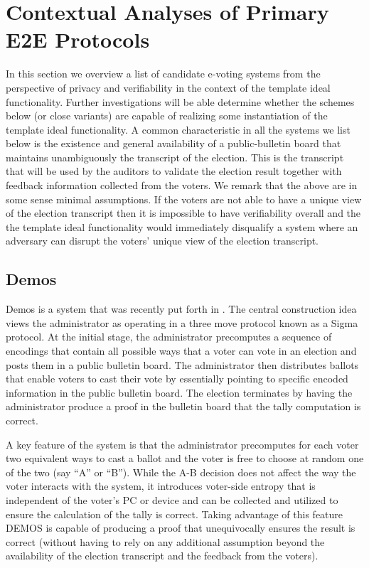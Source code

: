 \section{Contextual Analyses of Primary E2E Protocols}

In this section we overview a list of candidate e-voting systems from
the perspective of privacy and verifiability in the context of the
template ideal functionality. Further investigations will be able
determine whether the schemes below (or close variants) are capable of
realizing some instantiation of the template ideal functionality.  A
common characteristic in all the systems we list below is the
existence and general availability of a public-bulletin board that
maintains unambiguously the transcript of the election. This is the
transcript that will be used by the auditors to validate the election
result together with feedback information collected from the voters.
We remark that the above are in some sense minimal assumptions. If the
voters are not able to have a unique view of the election transcript
then it is impossible to have verifiability overall and the the
template ideal functionality would immediately disqualify a system
where an adversary can disrupt the voters' unique view of the election
transcript.

\subsection{Demos}

Demos is a system that was recently put forth in \cite{demos}. The
central construction idea views the administrator as operating in a
three move protocol known as a Sigma protocol. At the initial stage,
the administrator precomputes a sequence of encodings that contain all
possible ways that a voter can vote in an election and posts them in a
public bulletin board.  The administrator then distributes ballots
that enable voters to cast their vote by essentially pointing to
specific encoded information in the public bulletin board. The
election terminates by having the administrator produce a proof in the
bulletin board that the tally computation is correct.

A key feature of the system is that the administrator precomputes for
each voter two equivalent ways to cast a ballot and the voter is free
to choose at random one of the two (say ``A'' or ``B''). While the A-B
decision does not affect the way the voter interacts with the system,
it introduces voter-side entropy that is independent of the voter's PC
or device and can be collected and utilized to ensure the calculation
of the tally is correct. Taking advantage of this feature DEMOS is
capable of producing a proof that unequivocally ensures the result is
correct (without having to rely on any additional assumption beyond
the availability of the election transcript and the feedback from the
voters).


